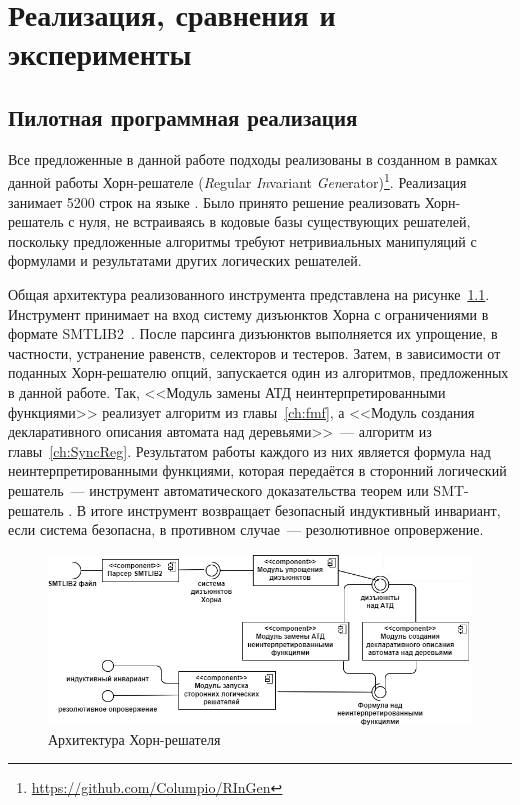 \chapter{Реализация, сравнения и эксперименты}\label{ch:evaluation}

\section{Пилотная программная реализация}
Все предложенные в данной работе подходы реализованы в созданном в рамках данной работы Хорн-решателе \theringen{} (\emph{R}egular \emph{In}variant \emph{Gen}erator)\footnote{\url{https://github.com/Columpio/RInGen}}.
Реализация занимает 5200 строк на языке \fsharp{}.
Было принято решение реализовать Хорн-решатель с нуля, не встраиваясь в кодовые базы существующих решателей, поскольку предложенные алгоритмы требуют нетривиальных манипуляций с формулами и результатами других логических решателей.


Общая архитектура реализованного инструмента представлена на рисунке~\ref{fig:ringen-arch}.
Инструмент \theringen{} принимает на вход систему дизъюнктов Хорна с ограничениями в формате SMTLIB2~\cite{BarFT-RR-17}.
После парсинга дизъюнктов выполняется их  упрощение, в частности, устранение равенств, селекторов и тестеров. Затем, в зависимости от поданных Хорн-решателю опций, запускается один из алгоритмов, предложенных в данной работе. Так, <<Модуль замены АТД неинтерпретированными функциями>> реализует алгоритм из главы~\ref{ch:fmf}, а <<Модуль создания декларативного описания автомата над деревьями>>~--- алгоритм из главы~\ref{ch:SyncReg}. Результатом работы каждого из них является формула над неинтерпретированными функциями, которая передаётся в сторонний логический решатель~--- инструмент автоматического доказательства теорем \vampire{} или SMT-решатель \cvc{}.
В итоге инструмент возвращает безопасный индуктивный инвариант, если система безопасна, в противном случае~--- резолютивное опровержение.
\begin{figure}[h]
    \centering
    \includegraphics[width=\textwidth]{Dissertation/images/arch.png}
    \caption{Архитектура Хорн-решателя \theringen{}}
    \label{fig:ringen-arch}
\end{figure}


